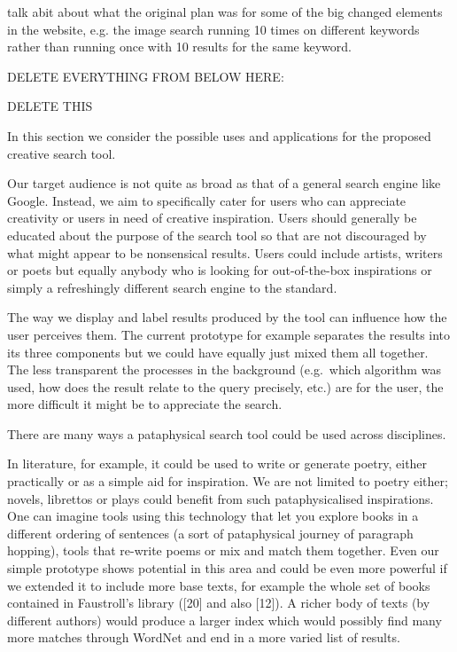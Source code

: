 {\begin{draft}
  talk abit about what the original plan was for some of the big changed elements in the website, e.g. the image search running 10 times on different keywords rather than running once with 10 results for the same keyword.
\end{draft}


DELETE EVERYTHING FROM BELOW HERE:


\begin{draft}
DELETE THIS

In this section we consider the possible uses and applications for the proposed creative search tool.

Our target audience is not quite as broad as that of a general search engine like Google. Instead, we aim to specifically cater for users who can appreciate creativity or users in need of creative inspiration. Users should generally be educated about the purpose of the search tool so that are not discouraged by what might appear to be nonsensical results. Users could include artists, writers or poets but equally anybody who is looking for out-of-the-box inspirations or simply a refreshingly different search engine to the standard.

The way we display and label results produced by the tool can influence how the user perceives them. The current prototype for example separates the results into its three components but we could have equally just mixed them all together. The less transparent the processes in the background (e.g.\ which algorithm was used, how does the result relate to the query precisely, etc.) are for the user, the more difficult it might be to appreciate the search.

There are many ways a pataphysical search tool could be used across disciplines.

In literature, for example, it could be used to write or generate poetry, either practically or as a simple aid for inspiration. We are not limited to poetry either; novels, librettos or plays could benefit from such pataphysicalised inspirations. One can imagine tools using this technology that let you explore books in a different ordering of sentences (a sort of pataphysical journey of paragraph hopping), tools that re-write poems or mix and match them together. Even our simple prototype shows potential in this area and could be even more powerful if we extended it to include more base texts, for example the whole set of books contained in Faustroll’s library ([20] and also [12]). A richer body of texts (by different authors) would produce a larger index which would possibly find many more matches through WordNet and end in a more varied list of results.


\end{draft}}
